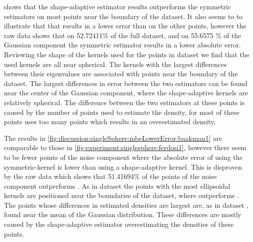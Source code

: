 		 shows that the shape-adaptive estimator results outperforms the symmetric estimators on most points near the boundary of the dataset. It also seems to to illustrate that that \mbe results in a lower error than \sambe on the other points, however the raw data shows that on \num{52.72411}\% of the full dataset, and on \num{55.6575} \% of the Gaussian component the symmetric estimator results in a lower absolute error.
		Reviewing the shape of the kernels used for the points in dataset \ferdosiOne we find that the used kernels are all near spherical. The kernels with the largest differences between their eigenvalues are associated with points near the boundary of the dataset. 
		The largest differences in error between the two estimators can be found near the center of the Gaussian component, where the shape-adaptive kernels are relatively spherical. The difference between the two estimators at these points is caused by the number of points used to estimate the density, for most of these points \sambe uses too many points which results in an overestimated density. 

		The results in \cref{fig:discussion:singleSphere:mbeLowerError:baakman1} are comparable to those in \cref{fig:experiment:singlesphere:ferdosi1}, however there seem to be fewer points of the noise component where the absolute error of using the symmetric-kernel is lower than using a shape-adaptive kernel. This is disproven by the raw data which shows that \num{51.41694}\% of the points of the noise component \mbe outperforms \sambe. 
		As in dataset \ferdosiOne the points with the most ellipsoidal kernels are positioned near the boundaries of the dataset, where \sambe outperforms \mbe. 
		The points whose differences in estimated densities are largest are, as in dataset \ferdosiOne, found near the mean of the Gaussian distribution. These differences are mostly caused by the shape-adaptive estimator overestimating the densities of these points.



